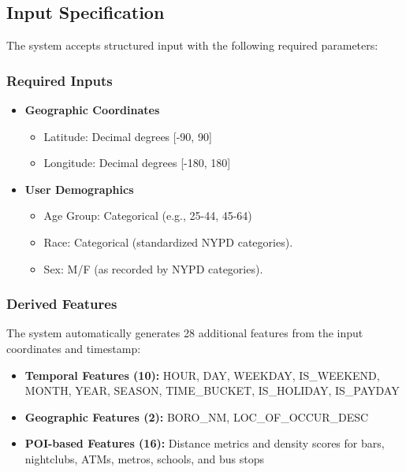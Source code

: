 \documentclass[11pt]{article}
\begin{document}
\subsection{Input Specification}
The system accepts structured input with the following required parameters:

\subsubsection{Required Inputs}
\begin{itemize}[leftmargin=*]
\item \textbf{Geographic Coordinates}
  \begin{itemize}
  \item Latitude: Decimal degrees [-90, 90]
  \item Longitude: Decimal degrees [-180, 180]
  \end{itemize}
\item \textbf{User Demographics}
  \begin{itemize}
  \item Age Group: Categorical (e.g., 25-44, 45-64)
  \item Race: Categorical (standardized NYPD categories).
  \item Sex: M/F (as recorded by NYPD categories).
  \end{itemize}
\end{itemize}

\subsubsection{Derived Features}
The system automatically generates 28 additional features from the input coordinates and timestamp:
\begin{itemize}[leftmargin=*]
\item \textbf{Temporal Features (10):} HOUR, DAY, WEEKDAY, IS\_WEEKEND, MONTH, YEAR, SEASON, TIME\_BUCKET, IS\_HOLIDAY, IS\_PAYDAY
\item \textbf{Geographic Features (2):} BORO\_NM, LOC\_OF\_OCCUR\_DESC
\item \textbf{POI-based Features (16):} Distance metrics and density scores for bars, nightclubs, ATMs, metros, schools, and bus stops
\end{itemize}
\end{document}
